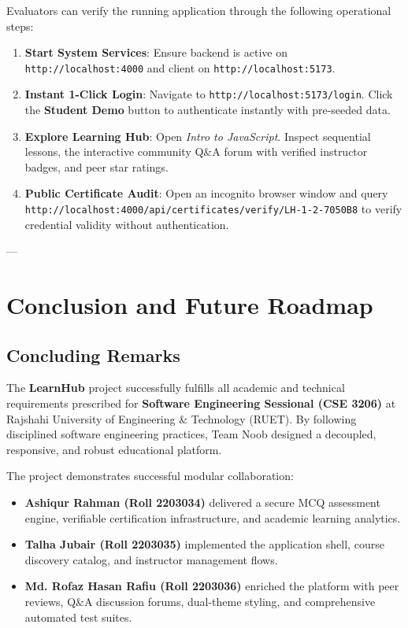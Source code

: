 \documentclass[12pt,a4paper]{report}
\begin{document}
Evaluators can verify the running application through the following operational steps:
\begin{enumerate}[itemsep=3pt]
    \item \textbf{Start System Services}: Ensure backend is active on \texttt{http://localhost:4000} and client on \texttt{http://localhost:5173}.
    \item \textbf{Instant 1-Click Login}: Navigate to \texttt{http://localhost:5173/login}. Click the \textbf{Student Demo} button to authenticate instantly with pre-seeded data.
    \item \textbf{Explore Learning Hub}: Open \textit{Intro to JavaScript}. Inspect sequential lessons, the interactive community Q\&A forum with verified instructor badges, and peer star ratings.
    \item \textbf{Public Certificate Audit}: Open an incognito browser window and query \texttt{http://localhost:4000/api/certificates/verify/LH-1-2-7050B8} to verify credential validity without authentication.
\end{enumerate}

---

\chapter{Conclusion and Future Roadmap}

\section{Concluding Remarks}
The \textbf{LearnHub} project successfully fulfills all academic and technical requirements prescribed for \textbf{Software Engineering Sessional (CSE 3206)} at Rajshahi University of Engineering \& Technology (RUET). By following disciplined software engineering practices, Team Noob designed a decoupled, responsive, and robust educational platform.

The project demonstrates successful modular collaboration:
\begin{itemize}[itemsep=3pt]
    \item \textbf{Ashiqur Rahman (Roll 2203034)} delivered a secure MCQ assessment engine, verifiable certification infrastructure, and academic learning analytics.
    \item \textbf{Talha Jubair (Roll 2203035)} implemented the application shell, course discovery catalog, and instructor management flows.
    \item \textbf{Md. Rofaz Hasan Rafiu (Roll 2203036)} enriched the platform with peer reviews, Q\&A discussion forums, dual-theme styling, and comprehensive automated test suites.
\end{itemize}
\end{document}
